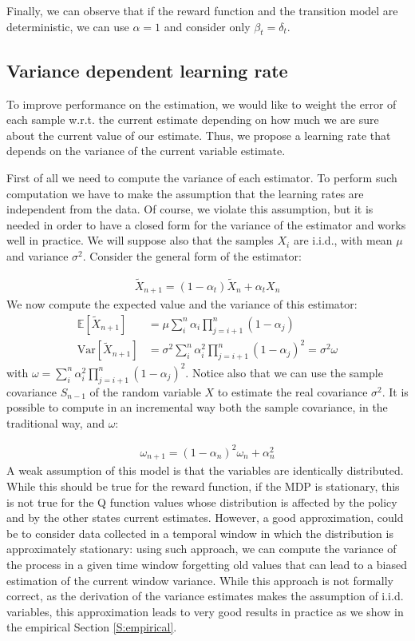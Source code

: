 \documentclass[conference]{IEEEtran}
\begin{document}
Finally, we can observe that if the reward function and the transition model are deterministic, we can use $\alpha=1$ and consider only $\beta_t=\delta_t$.

\subsection{Variance dependent learning rate}
To improve performance on the estimation, we would like to weight the error of each sample w.r.t. the current estimate depending on how much we are sure about the current value of our estimate. Thus, we propose a learning rate that depends on the variance of the current variable estimate.

First of all we need to compute the variance of each estimator. To perform such computation we have to make the assumption that the learning rates are independent from the data. Of course, we violate this assumption, but it is needed in order to have a closed form for the variance of the estimator and works well in practice. We will suppose also that the samples $X_i$ are i.i.d., with mean $\mu$ and variance $\sigma^2$. Consider the general form of the estimator:

\begin{align}
 \widetilde{X}_{n+1} = (1-\alpha_t)\widetilde{X}_{n}+\alpha_tX_{n}
\end{align}
We now compute the expected value and the variance of this estimator:
\begin{align}
 \mathbb{E}\left[\widetilde{X}_{n+1}\right]& = \mu\sum_i^n \alpha_i \prod_{j=i+1}^{n} \left(1-\alpha_j\right)\\
 \mathrm{Var}\left[\widetilde{X}_{n+1}\right]& = \sigma^2\sum_i^n \alpha_i^2 \prod_{j=i+1}^{n} \left(1-\alpha_j\right)^2 = \sigma^2\omega
\end{align}
with $\omega=\sum_i^n \alpha_i^2 \prod_{j=i+1}^{n} \left(1-\alpha_j\right)^2$. Notice also that we can use the sample covariance $S_{n-1}$ of the random variable $X$ to estimate the real covariance $\sigma^2$. It is possible to compute in an incremental way both the sample covariance, in the traditional way, and $\omega$:

\begin{align}
 \omega_{n+1}=(1-\alpha_n)^2\omega_n+\alpha_n^2
\end{align}
A weak assumption of this model is that the variables are identically distributed. While this should be true for the reward function, if the MDP is stationary, this is not true for the Q function values whose distribution is affected by the policy and by the other states current estimates. However, a good approximation, could be to consider data collected in a temporal window in which the distribution is approximately stationary: using such approach, we can compute the variance of the process in a given time window forgetting old values that can lead to a biased estimation of the current window variance. While this approach is not formally correct, as the derivation of the variance estimates makes the assumption of i.i.d. variables, this approximation leads to very good results in practice as we show in the empirical Section \ref{S:empirical}.
\end{document}
